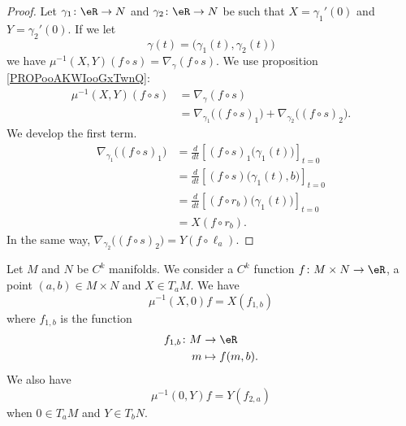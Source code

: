 \begin{proof}
	Let \(\gamma_1 \colon \eR\to N  \) and \(\gamma_2 \colon \eR\to N  \) be such that \( X=\gamma_1'(0)\) and \( Y=\gamma_2'(0)\). If we let
	\begin{equation}
		\gamma(t)=\big( \gamma_1(t),\gamma_2(t) \big)
	\end{equation}
	we have \( \mu^{-1}(X,Y)(f\circ s)=\nabla_{\gamma}(f\circ s)\). We use proposition \ref{PROPooAKWIooGxTwnQ}:
	\begin{subequations}
		\begin{align}
			\mu^{-1}(X,Y)(f\circ s) & =\nabla_{\gamma}(f\circ s)                                                            \\
			                        & =\nabla_{\gamma_1}\big( (f\circ s)_1 \big)+\nabla_{\gamma_2}\big( (f\circ s)_2 \big).
		\end{align}
	\end{subequations}
	We develop the first term.
	\begin{subequations}
		\begin{align}
			\nabla_{\gamma_1}\big( (f\circ s)_1 \big) & =\frac{d}{dt} \left[ (f\circ s)_1\big( \gamma_1(t) \big)  \right]_{t=0} \\
			                                          & =\frac{d}{dt} \left[ (f\circ s)\big( \gamma_1(t),b \big)  \right]_{t=0} \\
			                                          & =\frac{d}{dt} \left[ (f\circ r_b)\big( \gamma_1(t) \big)  \right]_{t=0} \\
			                                          & =X(f\circ r_b).
		\end{align}
	\end{subequations}
	In the same way, \( \nabla_{\gamma_2}\big( (f\circ s)_2 \big)=Y(f\circ \ell_a)\).
\end{proof}

\begin{proposition}	\label{PROPooYACVooMwEhBj}
	Let \( M\) and \( N\) be \( C^k\) manifolds. We consider a \( C^k\) function \(f \colon M\times N\to \eR  \), a point \( (a,b)\in M\times N\) and \(X\in T_aM \). We have
	\begin{equation}
		\mu^{-1}(X,0)f=X(f_{1,b})
	\end{equation}
	where \( f_{1,b}\) is the function
	\begin{equation}
		\begin{aligned}
			f_{1,b}\colon M & \to \eR         \\
			m               & \mapsto f(m,b).
		\end{aligned}
	\end{equation}
	We also have
	\begin{equation}		\label{EQooNAGYooKZCLKz}
		\mu^{-1}(0,Y)f =Y(f_{2,a})
	\end{equation}
	when \( 0\in T_aM\) and \( Y\in T_bN\).
\end{proposition}

